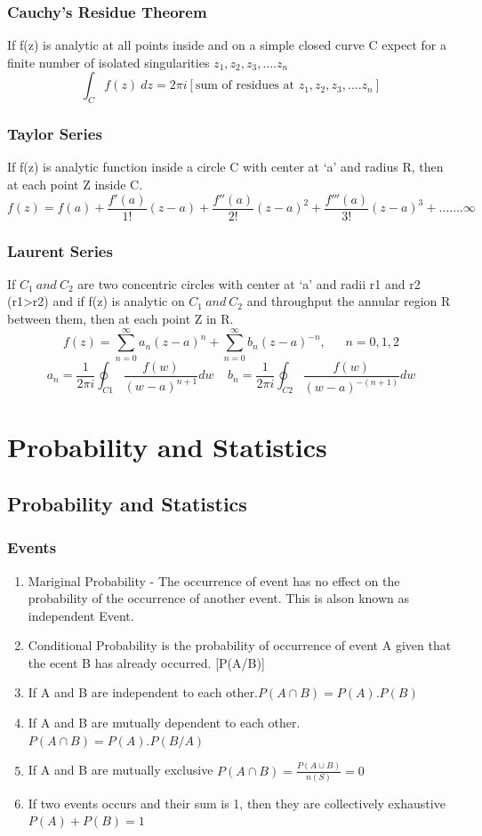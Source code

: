 \subsection*{Cauchy's Residue Theorem}
If f(z) is analytic at all points inside and on a simple closed curve C expect for a finite number of isolated singularities \(z_1, z_2, z_3,\ldots.z_n\)
\[\int_C f(z)\ dz=2\pi i[\text{sum of residues at } z_1, z_2, z_3,\ldots.z_n]\]

\subsection{Taylor Series}
If f(z) is analytic function inside a circle C with center at `a' and radius R, then at each point Z inside C.
\[f(z)=f(a)+\frac{f'(a)}{1!}(z-a)+\frac{f''(a)}{2!}(z-a)^2+\frac{f'''(a)}{3!}(z-a)^3+\ldots\ldots.\infty\]

\subsection{Laurent Series}
If \(C_1\ and\ C_2\) are two concentric circles with center at `a' and radii r1 and r2 (r1>r2) and if f(z) is analytic on \(C_1\ and\ C_2\) and throughput the annular region R between them, then at each point Z in R.
\[f(z)=\sum_{n=0}^{\infty}a_n(z-a)^n+\sum_{n=0}^{\infty}b_n(z-a)^{-n}, \ \ \ \ \ \ \ n=0, 1, 2\]
\[a_n=\frac{1}{2\pi i}\oint_{C1}\frac{f(w)}{(w-a)^{n+1}}dw\ \ \ \ \ b_n=\frac{1}{2\pi i}\oint_{C2}\frac{f(w)}{(w-a)^{-(n+1)}}dw\]

\chapter*{Probability and Statistics}
\section{Probability and Statistics}

\subsection*{Events}
\begin{enumerate}
    \item Mariginal Probability - The occurrence of event has no effect on the probability of the occurrence of another event. This is alson known as independent Event.
    \item Conditional Probability is the probability of occurrence of event A given that the ecent B has already occurred. [P(A/B)]
    \item If A and B are independent to each other.\(P(A \cap B)=P(A).P(B)\)
    \item If A and B are mutually dependent to each other. \(P(A\cap B)=P(A).P(B/A)\)
    \item If A and B are mutually exclusive \(P(A \cap B)=\frac{P(A\cup B)}{n(S)}=0\)
    \item If two events occurs and their sum is 1, then they are collectively exhaustive\\ \(P(A)+P(B)=1\) 
\end{enumerate}

